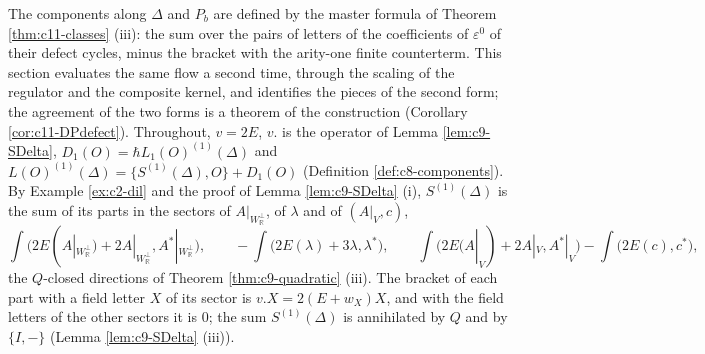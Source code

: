 The components along $\Delta$ and $P_b$ are defined by the master formula of Theorem \ref{thm:c11-classes} (iii): the sum over the pairs of letters of the coefficients of $\varepsilon^0$ of their defect cycles, minus the bracket with the arity-one finite counterterm. This section evaluates the same flow a second time, through the scaling of the regulator and the composite kernel, and identifies the pieces of the second form; the agreement of the two forms is a theorem of the construction (Corollary \ref{cor:c11-DPdefect}). Throughout, $v=2E$, $v.$ is the operator of Lemma \ref{lem:c9-SDelta}, $D_1(O)=\hbar L_1(O)^{(1)}(\Delta)$ and $L(O)^{(1)}(\Delta)=\{S^{(1)}(\Delta),O\}+D_1(O)$ (Definition \ref{def:c8-components}). By Example \ref{ex:c2-dil} and the proof of Lemma \ref{lem:c9-SDelta} (i), $S^{(1)}(\Delta)$ is the sum of its parts in the sectors of $A|_{W_{\mathbb R}^\perp}$, of $\lambda$ and of $(A|_V,c)$,
\[
\int\big(2E(A|_{W_{\mathbb R}^\perp})+2A|_{W_{\mathbb R}^\perp},A^*|_{W_{\mathbb R}^\perp}\big),\qquad -\int\big(2E(\lambda)+3\lambda,\lambda^*\big),\qquad \int\big(2E(A|_V)+2A|_V,A^*|_V\big)-\int\big(2E(c),c^*\big),
\]
the $Q$-closed directions of Theorem \ref{thm:c9-quadratic} (iii). The bracket of each part with a field letter $X$ of its sector is $v.X=2(E+w_X)X$, and with the field letters of the other sectors it is $0$; the sum $S^{(1)}(\Delta)$ is annihilated by $Q$ and by $\{I,-\}$ (Lemma \ref{lem:c9-SDelta} (iii)).


